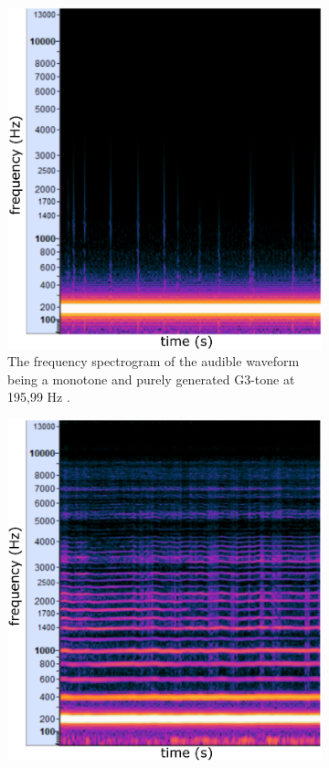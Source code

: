 \begin{figure}[ht!]
	\centering
		\begin{subfigure}[t]{.5\textwidth}
			\centering\captionsetup{width=.9\linewidth}%
			\includegraphics[width=0.9\linewidth]{Assets/Figures/Illustrations/G3_196Hz_PureTone_waveform_spectrogram.pdf}
			\caption{The frequency spectrogram of the audible waveform being a monotone and purely generated G3-tone at 195,99 Hz \cite{generate_tones}.}
			\label{fig:sub:G3_pure_waveform}
		\end{subfigure}%
		\begin{subfigure}[t]{.5\textwidth}
			\centering\captionsetup{width=.9\linewidth}%
			\includegraphics[width=0.9\linewidth]{Assets/Figures/Illustrations/G3_196Hz_HummingWaveform_FrequencySpectrum.pdf}

\end{subfigure}
\end{figure}
